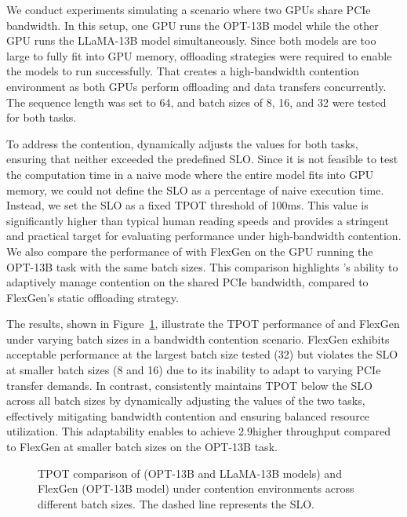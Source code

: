 We conduct experiments simulating a scenario where two GPUs share PCIe bandwidth. 
In this setup, one GPU runs the OPT-13B model while the other GPU runs the LLaMA-13B model simultaneously. 
Since both models are too large to fully fit into GPU memory, offloading strategies were required to enable the models to run successfully.
That creates a high-bandwidth contention environment as both GPUs perform offloading and data transfers concurrently. 
The sequence length was set to 64, and batch sizes of 8, 16, and 32 were tested for both tasks.

To address the contention, \sys dynamically adjusts the \interval values for both tasks, ensuring that neither exceeded the predefined SLO. 
Since it is not feasible to test the computation time in a naive mode where the entire model fits into GPU memory, we could not define the SLO as a percentage of naive execution time. 
Instead, we set the SLO as a fixed TPOT threshold of 100ms. 
This value is significantly higher than typical human reading speeds and provides a stringent and practical target for evaluating performance under high-bandwidth contention. 
We also compare the performance of \sys with FlexGen on the GPU running the OPT-13B task with the same batch sizes. 
This comparison highlights \sys's ability to adaptively manage contention on the shared PCIe bandwidth, compared to FlexGen's static offloading strategy.

The results, shown in Figure~\ref{fig:evalband}, illustrate the TPOT performance of \sys and FlexGen under varying batch sizes in a bandwidth contention scenario. 
FlexGen exhibits acceptable performance at the largest batch size tested (32) but violates the SLO at smaller batch sizes (8 and 16) due to its inability to adapt to varying PCIe transfer demands. 
In contrast, \sys consistently maintains TPOT below the SLO across all batch sizes by dynamically adjusting the \interval values of the two tasks, 
effectively mitigating bandwidth contention and ensuring balanced resource utilization. 
This adaptability enables \sys to achieve 2.9\X higher throughput compared to FlexGen at smaller batch sizes on the OPT-13B task.


\begin{figure}[t]
    \centering
    \resizebox{0.6\columnwidth}{!}{
 }
    \caption{TPOT comparison of \sys (OPT-13B and LLaMA-13B models) and FlexGen (OPT-13B model) under contention environments across different batch sizes.
 The dashed line represents the SLO.}
    \label{fig:evalband}
\end{figure}



